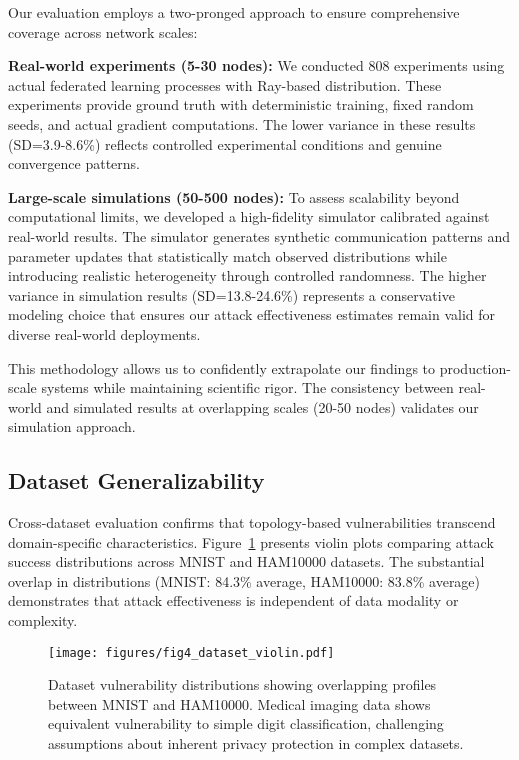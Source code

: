 Our evaluation employs a two-pronged approach to ensure comprehensive coverage across network scales:

\textbf{Real-world experiments (5-30 nodes):} We conducted 808 experiments using actual federated learning processes with Ray-based distribution. These experiments provide ground truth with deterministic training, fixed random seeds, and actual gradient computations. The lower variance in these results (SD=3.9-8.6\%) reflects controlled experimental conditions and genuine convergence patterns.

\textbf{Large-scale simulations (50-500 nodes):} To assess scalability beyond computational limits, we developed a high-fidelity simulator calibrated against real-world results. The simulator generates synthetic communication patterns and parameter updates that statistically match observed distributions while introducing realistic heterogeneity through controlled randomness. The higher variance in simulation results (SD=13.8-24.6\%) represents a conservative modeling choice that ensures our attack effectiveness estimates remain valid for diverse real-world deployments.

This methodology allows us to confidently extrapolate our findings to production-scale systems while maintaining scientific rigor. The consistency between real-world and simulated results at overlapping scales (20-50 nodes) validates our simulation approach.

\subsection{Dataset Generalizability}

Cross-dataset evaluation confirms that topology-based vulnerabilities transcend domain-specific characteristics. Figure~\ref{fig:dataset_violin} presents violin plots comparing attack success distributions across MNIST and HAM10000 datasets. The substantial overlap in distributions (MNIST: 84.3\% average, HAM10000: 83.8\% average) demonstrates that attack effectiveness is independent of data modality or complexity.

\begin{figure}[!t]
\centering
\texttt{[image: figures/fig4\_dataset\_violin.pdf]}
\caption{Dataset vulnerability distributions showing overlapping profiles between MNIST and HAM10000. Medical imaging data shows equivalent vulnerability to simple digit classification, challenging assumptions about inherent privacy protection in complex datasets.}
\label{fig:dataset_violin}
\end{figure}

